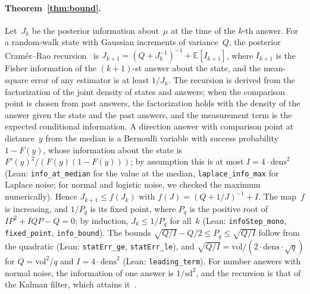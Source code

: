 \documentclass[doubleblind]{ecai}
\theoremstyle{remark}
\newcommand{\vol}{\mathrm{vol}}
\newcommand{\dens}{\mathrm{dens}}
\newcommand{\sd}{\mathrm{sd}}
\begin{document}
\paragraph{Theorem~\ref{thm:bound}.}
Let~$J_k$ be the posterior information about~$\mu$ at the time of the $k$-th answer. For a random-walk state with Gaussian increments of variance~$Q$, the posterior Cram\'er--Rao recursion~\cite{tichavsky1998pcrb} is $J_{k+1} = (Q + J_k^{-1})^{-1} + \mathbb{E}[I_{k+1}]$, where $I_{k+1}$ is the Fisher information of the $(k{+}1)$-st answer about the state, and the mean-square error of any estimator is at least $1/J_k$. The recursion is derived from the factorization of the joint density of states and answers; when the comparison point is chosen from past answers, the factorization holds with the density of the answer given the state and the past answers, and the measurement term is the expected conditional information. A direction answer with comparison point at distance~$y$ from the median is a Bernoulli variable with success probability $1-F(y)$, whose information about the state is $F'(y)^2/(F(y)(1-F(y)))$; by assumption this is at most $I = 4\cdot\dens^2$ (Lean: \texttt{info\_at\_median} for the value at the median, \texttt{laplace\_info\_max} for Laplace noise; for normal and logistic noise, we checked the maximum numerically). Hence $J_{k+1} \le f(J_k)$ with $f(J) = (Q+1/J)^{-1} + I$. The map~$f$ is increasing, and $1/P_q$ is its fixed point, where $P_q$ is the positive root of $I P^2 + IQ P - Q = 0$; by induction, $J_k \le 1/P_q$ for all~$k$ (Lean: \texttt{infoStep\_mono}, \texttt{fixed\_point}, \texttt{info\_bound}). The bounds $\sqrt{Q/I} - Q/2 \le P_q \le \sqrt{Q/I}$ follow from the quadratic (Lean: \texttt{statErr\_ge}, \texttt{statErr\_le}), and $\sqrt{Q/I} = \vol/(2\cdot\dens\cdot\sqrt q)$ for $Q = \vol^2/q$ and $I = 4\cdot\dens^2$ (Lean: \texttt{leading\_term}). For number answers with normal noise, the information of one answer is $1/\sd^2$, and the recursion is that of the Kalman filter, which attains it~\cite{tichavsky1998pcrb}.
\end{document}
